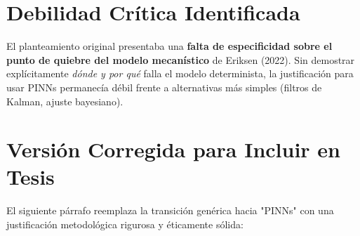 \documentclass[12pt,oneside]{book}
\newcommand{\critical}[1]{\textcolor{criticalred}{\textbf{#1}}}
\begin{document}
\section{Debilidad Crítica Identificada}

El planteamiento original presentaba una \critical{falta de especificidad sobre el punto de quiebre del modelo mecanístico} de Eriksen (2022). Sin demostrar explícitamente \textit{dónde y por qué} falla el modelo determinista, la justificación para usar PINNs permanecía débil frente a alternativas más simples (filtros de Kalman, ajuste bayesiano).

\section{Versión Corregida para Incluir en Tesis}

El siguiente párrafo reemplaza la transición genérica hacia "PINNs" con una justificación metodológica rigurosa y éticamente sólida:
\end{document}
